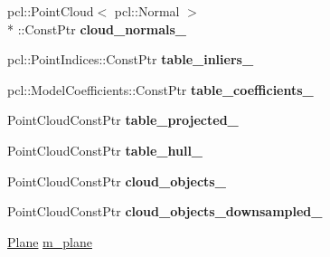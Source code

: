 \begin{DoxyCompactItemize}
\item 
\hypertarget{classope_1_1_table_object_detector_a7fd0ce88c1e193b5e5e974a78db473ea}{pcl\-::\-Point\-Cloud$<$ pcl\-::\-Normal $>$\\*
\-::Const\-Ptr {\bfseries cloud\-\_\-normals\-\_\-}}\label{classope_1_1_table_object_detector_a7fd0ce88c1e193b5e5e974a78db473ea}

\item 
\hypertarget{classope_1_1_table_object_detector_abf292c8faabbf627c815a42047aadb4b}{pcl\-::\-Point\-Indices\-::\-Const\-Ptr {\bfseries table\-\_\-inliers\-\_\-}}\label{classope_1_1_table_object_detector_abf292c8faabbf627c815a42047aadb4b}

\item 
\hypertarget{classope_1_1_table_object_detector_a365c884cd5b5c613ffce412ba27fc56f}{pcl\-::\-Model\-Coefficients\-::\-Const\-Ptr {\bfseries table\-\_\-coefficients\-\_\-}}\label{classope_1_1_table_object_detector_a365c884cd5b5c613ffce412ba27fc56f}

\item 
\hypertarget{classope_1_1_table_object_detector_aad108e73a8d401b1d4668100b82b7a72}{Point\-Cloud\-Const\-Ptr {\bfseries table\-\_\-projected\-\_\-}}\label{classope_1_1_table_object_detector_aad108e73a8d401b1d4668100b82b7a72}

\item 
\hypertarget{classope_1_1_table_object_detector_a830f74fc24908512118a61e44cd6ea48}{Point\-Cloud\-Const\-Ptr {\bfseries table\-\_\-hull\-\_\-}}\label{classope_1_1_table_object_detector_a830f74fc24908512118a61e44cd6ea48}

\item 
\hypertarget{classope_1_1_table_object_detector_a091e36592c87ef3b8f3bb77932c7e617}{Point\-Cloud\-Const\-Ptr {\bfseries cloud\-\_\-objects\-\_\-}}\label{classope_1_1_table_object_detector_a091e36592c87ef3b8f3bb77932c7e617}

\item 
\hypertarget{classope_1_1_table_object_detector_a4330bb190856fa4adef141e4c2bc36f0}{Point\-Cloud\-Const\-Ptr {\bfseries cloud\-\_\-objects\-\_\-downsampled\-\_\-}}\label{classope_1_1_table_object_detector_a4330bb190856fa4adef141e4c2bc36f0}

\item 
\hypertarget{classope_1_1_table_object_detector_a253c42aaeaa008699dabe7177268104e}{\hyperlink{classope_1_1_plane}{Plane} \hyperlink{classope_1_1_table_object_detector_a253c42aaeaa008699dabe7177268104e}{m\-\_\-plane}}\label{classope_1_1_table_object_detector_a253c42aaeaa008699dabe7177268104e}


\end{DoxyCompactItemize}
